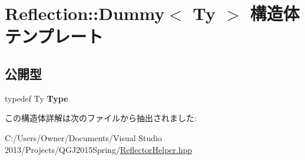 \hypertarget{struct_reflection_1_1_dummy}{}\section{Reflection\+:\+:Dummy$<$ Ty $>$ 構造体テンプレート}
\label{struct_reflection_1_1_dummy}
\subsection*{公開型}
\begin{DoxyCompactItemize}
\item 
typedef Ty {\bfseries Type}\hypertarget{struct_reflection_1_1_dummy_aaee5641b7c22c10816c23284d5258f2e}{}\label{struct_reflection_1_1_dummy_aaee5641b7c22c10816c23284d5258f2e}

\end{DoxyCompactItemize}


この構造体詳解は次のファイルから抽出されました\+:\begin{DoxyCompactItemize}
\item 
C\+:/\+Users/\+Owner/\+Documents/\+Visual Studio 2013/\+Projects/\+Q\+G\+J2015\+Spring/\hyperlink{_reflector_helper_8hpp}{Reflector\+Helper.\+hpp}\end{DoxyCompactItemize}
